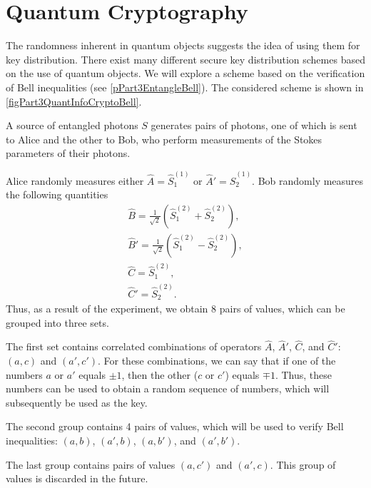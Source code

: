 \section{Quantum Cryptography}
\label{subsecPart3QuantInfoQuantCrypto}
The randomness inherent in quantum objects suggests the idea
of using them for key distribution. There exist many different
secure key distribution schemes based on the use of
quantum objects. We will explore a scheme based on the verification
of Bell inequalities (see \ref{pPart3EntangleBell}). The considered scheme
is shown in \autoref{figPart3QuantInfoCryptoBell}.



A source of entangled photons  $S$ generates pairs of photons,
one of which is sent to Alice and the other to Bob, who perform
measurements of the Stokes parameters of their photons.

Alice randomly measures either $\hat{A} = \hat{S}_1^{(1)}$
or $\hat{A}' = \hat{S}_2^{(1)}$. Bob randomly measures the following quantities 
\begin{eqnarray}
\hat{B} = \frac{1}{\sqrt{2}}\left(\hat{S}_1^{(2)} +
  \hat{S}_2^{(2)}\right), 
\nonumber \\
\hat{B}' = \frac{1}{\sqrt{2}}\left(\hat{S}_1^{(2)} - \hat{S}_2^{(2)}\right),
\nonumber \\
\hat{C} = \hat{S}_1^{(2)},
\nonumber \\
\hat{C}' = \hat{S}_2^{(2)}.
\nonumber
\end{eqnarray}
Thus, as a result of the experiment, we obtain 8 pairs of values,
which can be grouped into three sets.

The first set contains
correlated combinations of operators $\hat{A}$, $\hat{A}'$, $\hat{C}$, and
$\hat{C}'$: $\left(a, c\right)$ and $\left(a', c'\right)$. For these
combinations, we can say that if one of the numbers $a$ or $a'$
equals $\pm 1$, then the other ($c$ or $c'$) equals $\mp 1$. Thus,
these numbers can be used to obtain a random
sequence of numbers, which will subsequently be used as the key.

The second group contains 4 pairs of values, which will
be used to verify Bell inequalities: $\left(a, b\right)$,
$\left(a', b\right)$, $\left(a, b'\right)$, and $\left(a', b'\right)$.

The last group contains pairs of values $\left(a, c'\right)$ and
$\left(a', c\right)$. This group of values is discarded in the future.


